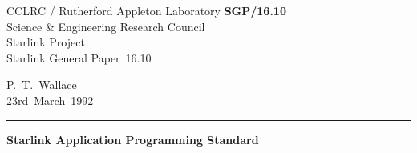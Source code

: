\documentclass[twoside,11pt]{article}
\newcommand{\stardoccategory}  {Starlink General Paper}
\newcommand{\stardocinitials}  {SGP}
\newcommand{\stardocnumber}    {16.10}
\newcommand{\stardocauthors}   {P.~T.~Wallace}
\newcommand{\stardocdate}      {23rd~March~1992}
\newcommand{\stardoctitle}     {Starlink Application Programming Standard}
\newcommand{\stardocname}{\stardocinitials /\stardocnumber}
\newenvironment{latexonly}{}{}
\renewcommand{\_}{{\tt\char'137}}
\begin{document}
\thispagestyle{empty}

\begin{latexonly}
   CCLRC / {\sc Rutherford Appleton Laboratory} \hfill {\bf \stardocname}\\
   {\large Science \& Engineering Research Council}\\
   {\large Starlink Project\\}
   {\large \stardoccategory\ \stardocnumber}
   \begin{flushright}
   \stardocauthors\\
   \stardocdate
   \end{flushright}
   \vspace{-4mm}
   \rule{\textwidth}{0.5mm}
   \vspace{5mm}
   \begin{center}
   {\Large\bf \stardoctitle}
   \end{center}
   \vspace{5mm}

\end{latexonly}
\end{document}
